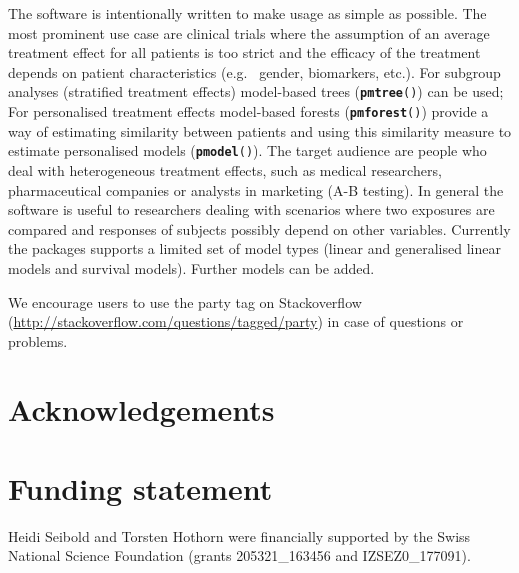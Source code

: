 \documentclass{josr}\usepackage[]{graphicx}\usepackage[]{color}
\newcommand{\hlstd}[1]{\textcolor[rgb]{0.345,0.345,0.345}{#1}}%
\newcommand{\hlkwd}[1]{\textcolor[rgb]{0.737,0.353,0.396}{\textbf{#1}}}%
\newcommand{\new}[1]{{\color{blue} #1}}
\begin{document}
The software is intentionally written to make usage as simple as possible. The
most prominent use case are clinical trials where the assumption of an average
treatment effect for all patients is too strict and the efficacy of the
treatment depends on patient characteristics (e.g.~ gender, biomarkers, etc.).
For subgroup analyses (stratified treatment effects) model-based trees
(\texttt{\hlkwd{pmtree}\hlstd{()}}) can be used; For personalised treatment effects
model-based forests (\texttt{\hlkwd{pmforest}\hlstd{()}}) provide a way of estimating
similarity between patients and using this similarity measure to estimate
personalised models (\texttt{\hlkwd{pmodel}\hlstd{()}}).  The target audience are people who
deal with heterogeneous treatment effects, such as medical researchers,
pharmaceutical companies or analysts in marketing (A-B testing).  In general
the software is useful to researchers dealing with scenarios where two
exposures are compared and responses of subjects possibly depend on other
variables.
\new{
Currently the packages supports a limited set of model types (linear and generalised
linear models and survival models). Further models can be added.
}

We encourage users to use the party tag on Stackoverflow
(\url{http://stackoverflow.com/questions/tagged/party}) in case of questions or
problems.


\section*{Acknowledgements}



\section*{Funding statement}
Heidi Seibold and Torsten Hothorn were financially supported by the Swiss
National Science Foundation (grants 205321\_163456 and IZSEZ0\_177091).
\end{document}
